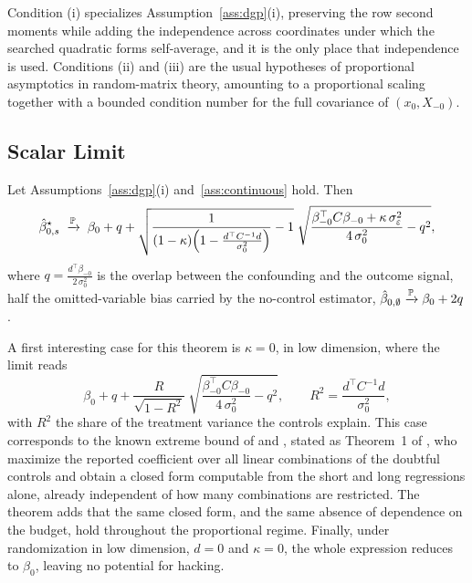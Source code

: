 Condition (i) specializes Assumption~\ref{ass:dgp}(i), preserving the
row second moments while adding the independence across coordinates under
which the searched quadratic forms self-average, and it is the only place
that independence is used. Conditions (ii) and (iii) are the usual
hypotheses of proportional asymptotics in random-matrix theory, amounting
to a proportional scaling together with a bounded condition number for
the full covariance of $(x_0, X_{-0})$.

\subsection{Scalar Limit}


\begin{theorem}
\label{thm:continuous}
Let Assumptions~\ref{ass:dgp}(i) and~\ref{ass:continuous} hold. Then
\begin{equation}\label{eq:continuous-limit}
        \hat\beta_{0,s}^\star
        \;\xrightarrow{\mathbb{P}}\;
        \beta_0 + q
        + \sqrt{\frac{1}
        {(1-\kappa)\!\left(1 - \frac{d^\top C^{-1} d}{\sigma_0^2}\right)}
        - 1}\;
        \sqrt{\frac{\beta_{-0}^\top C \beta_{-0}
        + \kappa\, \sigma_\varepsilon^2}{4\, \sigma_0^2} - q^2},
\end{equation}
where $q = \frac{d^\top \beta_{-0}}{2\, \sigma_0^2}$ is the overlap between
the confounding and the outcome signal, half the omitted-variable bias
carried by the no-control estimator, $\hat\beta_{0,\emptyset} \xrightarrow{\mathbb{P}}
\beta_0 + 2q$.
\end{theorem}

A first interesting case for this theorem is $\kappa = 0$, in low
dimension, where the limit reads
\begin{equation*}
        \beta_0 + q
        + \frac{R}{\sqrt{1 - R^2}}\;
        \sqrt{\frac{\beta_{-0}^\top C \beta_{-0}}{4\, \sigma_0^2} - q^2},
        \qquad
        R^2 = \frac{d^\top C^{-1} d}{\sigma_0^2},
\end{equation*}
with $R^2$ the share of the treatment variance the controls explain. This
case corresponds to the known extreme bound of
\citet[p.~311]{leamerLeonard1983reporting} and
\citet[eq.~(17)]{breusch1990simplified}, stated as Theorem~1 of
\citet{grangerUhlig1990reasonable}, who maximize the reported coefficient
over all linear combinations of the doubtful controls and obtain a closed
form computable from the short and long regressions alone, already
independent of how many combinations are restricted. The theorem adds
that the same closed form, and the same absence of dependence on the
budget, hold throughout the proportional regime. Finally, under
randomization in low dimension, $d = 0$ and $\kappa = 0$, the whole
expression reduces to $\beta_0$, leaving no potential for hacking.

